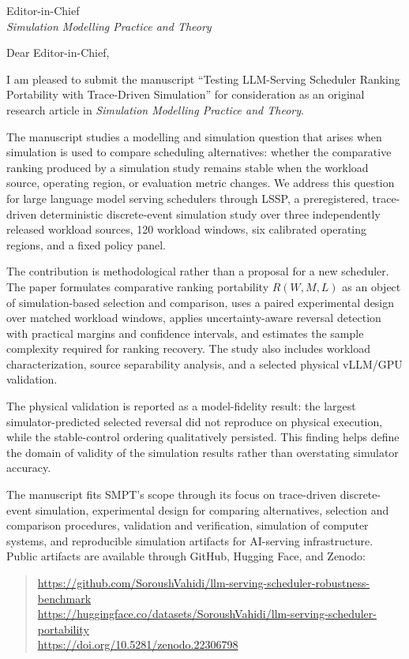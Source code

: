 \documentclass[10pt]{letter}
\date{October 2, 2026}
\begin{document}
\begin{letter}{Editor-in-Chief\\
\emph{Simulation Modelling Practice and Theory}}

\opening{Dear Editor-in-Chief,}

I am pleased to submit the manuscript ``Testing LLM-Serving Scheduler
Ranking Portability with Trace-Driven Simulation'' for
consideration as an original research article in \emph{Simulation Modelling
Practice and Theory}.

The manuscript studies a modelling and simulation question that arises when
simulation is used to compare scheduling alternatives: whether the
comparative ranking produced by a simulation study remains stable when the
workload source, operating region, or evaluation metric changes. We address
this question for large language model serving schedulers through LSSP, a
preregistered, trace-driven deterministic discrete-event simulation study
over three independently released workload sources, 120 workload windows,
six calibrated operating regions, and a fixed policy panel.

The contribution is methodological rather than a proposal for a new
scheduler. The paper formulates comparative ranking portability
$R(W,M,L)$ as an object of simulation-based selection and comparison,
uses a paired experimental design over matched workload windows, applies
uncertainty-aware reversal detection with practical margins and confidence
intervals, and estimates the sample complexity required for ranking
recovery. The study also includes workload characterization, source
separability analysis, and a selected physical vLLM/GPU validation.

The physical validation is reported as a model-fidelity result: the largest
simulator-predicted selected reversal did not reproduce on physical
execution, while the stable-control ordering qualitatively persisted. This
finding helps define the domain of validity of the simulation results
rather than overstating simulator accuracy.

The manuscript fits SMPT's scope through its focus on trace-driven
discrete-event simulation, experimental design for comparing alternatives,
selection and comparison procedures, validation and verification, simulation
of computer systems, and reproducible simulation artifacts for AI-serving
infrastructure. Public artifacts are available through GitHub, Hugging Face,
and Zenodo:
\begin{quote}\small
\url{https://github.com/SoroushVahidi/llm-serving-scheduler-robustness-benchmark}\\
\url{https://huggingface.co/datasets/SoroushVahidi/llm-serving-scheduler-portability}\\
\url{https://doi.org/10.5281/zenodo.22306798}
\end{quote}


\end{letter}
\end{document}
